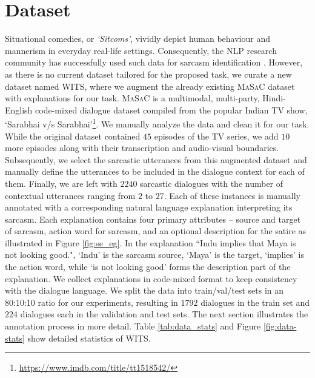 \documentclass[11pt]{article}
\newcommand{\dataset}{\textsc{WITS}}
\begin{document}
\section{Dataset}
\label{sec:dataset}
Situational comedies, or \textit{`Sitcoms'}, vividly depict human behaviour and mannerism in everyday real-life settings. Consequently, the NLP research community has successfully used such data for sarcasm identification \citep{castro2019multimodal, 9442359}. 
However, as there is no current dataset tailored for the proposed task, we curate a new dataset named \dataset, where we augment the already existing \textsc{MaSaC} dataset \citep{9442359} with explanations for our task. \textsc{MaSaC} is a multimodal, multi-party, Hindi-English code-mixed dialogue dataset compiled from the popular Indian TV show, `Sarabhai v/s Sarabhai'\footnote{\url{https://www.imdb.com/title/tt1518542/}}. 
We manually analyze the data and clean it for our task. 
While the original dataset contained $45$ episodes of the TV series, we add $10$ more episodes along with their transcription and audio-visual boundaries. Subsequently, we select the sarcastic utterances from this augmented dataset and manually define the utterances to be included in the dialogue context for each of them. Finally, we are left with $2240$ sarcastic dialogues with the number of contextual utterances ranging from $2$ to $27$. Each of these instances is manually annotated with a corresponding natural language explanation interpreting its sarcasm. Each explanation contains four primary attributes -- source and target of sarcasm, action word for sarcasm, and an optional description for the satire as illustrated in Figure \ref{fig:se_eg}. In the explanation ``Indu implies that Maya is not looking good.", `Indu' is the sarcasm source, `Maya' is the target, `implies' is the action word, while `is not looking good' forms the description part of the explanation. We collect explanations in code-mixed format to keep consistency with the dialogue language. We split the data into train/val/test sets in an 80:10:10 ratio for our experiments, resulting in $1792$ dialogues in the train set and $224$ dialogues each in the validation and test sets. 
The next section illustrates the annotation process in more detail.
Table \ref{tab:data_stats} and Figure \ref{fig:data-stats} show detailed statistics of \dataset. 
\end{document}
